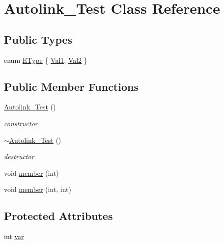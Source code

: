 \hypertarget{class_autolink___test}{}\section{Autolink\+\_\+\+Test Class Reference}
\label{class_autolink___test}
\subsection*{Public Types}
\begin{DoxyCompactItemize}
\item 
enum \mbox{\hyperlink{class_autolink___test_aeb611627c332d067bded1806b1bb45c2}{E\+Type}} \{ \mbox{\hyperlink{class_autolink___test_aeb611627c332d067bded1806b1bb45c2af70631e295bce280e74762d18af47a94}{Val1}}, 
\mbox{\hyperlink{class_autolink___test_aeb611627c332d067bded1806b1bb45c2a7d760f44a8971559d108a609b8fb9b3b}{Val2}}
 \}
\end{DoxyCompactItemize}
\subsection*{Public Member Functions}
\begin{DoxyCompactItemize}
\item 
\mbox{\hyperlink{class_autolink___test_a278d631f9943428c05b17d78f14488e2}{Autolink\+\_\+\+Test}} ()
\begin{DoxyCompactList}\small\item\em constructor \end{DoxyCompactList}\item 
\mbox{\hyperlink{class_autolink___test_a03bf46c8e2b733680035f524fd7b193b}{$\sim$\+Autolink\+\_\+\+Test}} ()
\begin{DoxyCompactList}\small\item\em destructor \end{DoxyCompactList}\item 
void \mbox{\hyperlink{class_autolink___test_a393ea281f235a2f603d98daf72b0d411}{member}} (int)
\item 
void \mbox{\hyperlink{class_autolink___test_acf783a43c2b4b6cc9dd2361784eca2e1}{member}} (int, int)
\end{DoxyCompactItemize}
\subsection*{Protected Attributes}
\begin{DoxyCompactItemize}
\item 
int \mbox{\hyperlink{class_autolink___test_a8de85603114bc9b9e53bd40764e9b499}{var}}
\end{DoxyCompactItemize}


